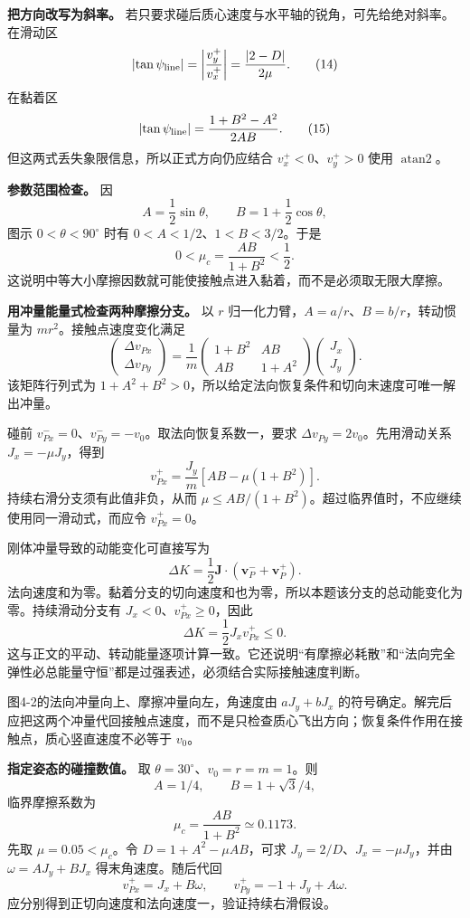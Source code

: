 \documentclass[12pt,a4paper,UTF8]{ctexart}
\begin{document}
\textbf{把方向改写为斜率。}
若只要求碰后质心速度与水平轴的锐角，可先给绝对斜率。在滑动区 \[
\left|\tan\psi_{\rm line}\right|
=\left|\frac{v_y^+}{v_x^+}\right|
=\frac{|2-D|}{2\mu}. \tag{14}
\] 在黏着区 \[
\left|\tan\psi_{\rm line}\right|
=\frac{1+B^2-A^2}{2AB}. \tag{15}
\] 但这两式丢失象限信息，所以正式方向仍应结合 \(v_x^+<0\)、\(v_y^+>0\)
使用 \(\operatorname{atan2}\)。

\textbf{参数范围检查。} 因 \[
A=\frac12\sin\theta,\qquad
B=1+\frac12\cos\theta,
\] 图示 \(0<\theta<90^\circ\) 时有 \(0<A<1/2\)、\(1<B<3/2\)。于是 \[
0<\mu_c=\frac{AB}{1+B^2}<\frac12.
\]
这说明中等大小摩擦因数就可能使接触点进入黏着，而不是必须取无限大摩擦。

\textbf{用冲量能量式检查两种摩擦分支。} 以 \(r\)
归一化力臂，\(A=a/r\)、\(B=b/r\)，转动惯量为
\(mr^2\)。接触点速度变化满足 \[
\begin{pmatrix}\Delta v_{Px}\\\Delta v_{Py}\end{pmatrix}
=\frac1m\begin{pmatrix}1+B^2&AB\\AB&1+A^2\end{pmatrix}
\begin{pmatrix}J_x\\J_y\end{pmatrix}.
\] 该矩阵行列式为
\(1+A^2+B^2>0\)，所以给定法向恢复条件和切向末速度可唯一解出冲量。

碰前 \(v_{Px}^-=0\)、\(v_{Py}^-=-v_0\)。取法向恢复系数一，要求
\(\Delta v_{Py}=2v_0\)。先用滑动关系 \(J_x=-\mu J_y\)，得到 \[
v_{Px}^+=\frac{J_y}{m}[AB-\mu(1+B^2)].
\] 持续右滑分支须有此值非负，从而
\(\mu\le AB/(1+B^2)\)。超过临界值时，不应继续使用同一滑动式，而应令
\(v_{Px}^+=0\)。

刚体冲量导致的动能变化可直接写为 \[
\Delta K=\frac12\bm J\cdot(\bm v_P^-+\bm v_P^+).
\]
法向速度和为零。黏着分支的切向速度和也为零，所以本题该分支的总动能变化为零。持续滑动分支有
\(J_x<0\)、\(v_{Px}^+\ge0\)，因此 \[
\Delta K=\frac12J_xv_{Px}^+\le0.
\]
这与正文的平动、转动能量逐项计算一致。它还说明``有摩擦必耗散''和``法向完全弹性必总能量守恒''都是过强表述，必须结合实际接触速度判断。

图4-2的法向冲量向上、摩擦冲量向左，角速度由 \(aJ_y+bJ_x\)
的符号确定。解完后应把这两个冲量代回接触点速度，而不是只检查质心飞出方向；恢复条件作用在接触点，质心竖直速度不必等于
\(v_0\)。

\textbf{指定姿态的碰撞数值。} 取 \(\theta=30^\circ\)、\(v_0=r=m=1\)。则
\[
A=1/4,\qquad B=1+\sqrt3/4,
\] 临界摩擦系数为 \[
\mu_c=\frac{AB}{1+B^2}\simeq0.1173.
\] 先取 \(\mu=0.05<\mu_c\)。令 \(D=1+A^2-\mu AB\)，可求
\(J_y=2/D\)、\(J_x=-\mu J_y\)，并由 \(\omega=AJ_y+BJ_x\)
得末角速度。随后代回 \[
v_{Px}^+=J_x+B\omega,
\qquad v_{Py}^+=-1+J_y+A\omega.
\] 应分别得到正切向速度和法向速度一，验证持续右滑假设。
\end{document}
